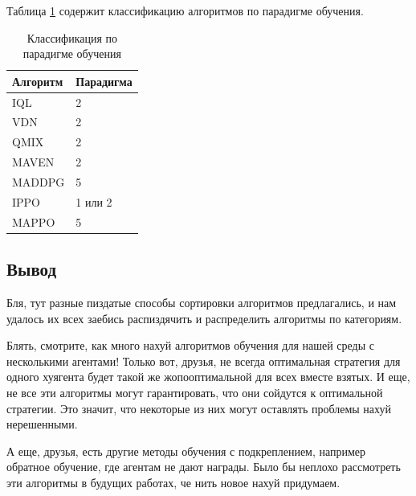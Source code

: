 
Таблица \ref{tab:paradigms} содержит классификацию алгоритмов по парадигме обучения.

\begin{table}[H]
	\centering
	\caption{Классификация по парадигме обучения}
	\label{tab:paradigms}
	\begin{tabular}{@{}|l|l|@{}}
	\toprule
	Алгоритм & Парадигма \\ \midrule
	IQL      & 2         \\
	VDN      & 2         \\
	QMIX     & 2         \\
	MAVEN    & 2         \\
	MADDPG   & 5         \\ 
	IPPO     & 1 или 2   \\
	MAPPO    & 5         \\
	\bottomrule
	\end{tabular}
\end{table}

\subsection*{Вывод}

Бля, тут разные пиздатые способы сортировки алгоритмов предлагались, и нам удалось их всех заебись распиздячить и распределить алгоритмы по категориям.


Блять, смотрите, как много нахуй алгоритмов обучения для нашей среды с несколькими агентами! Только вот, друзья, не всегда оптимальная стратегия для одного хуягента будет такой же жопооптимальной для всех вместе взятых. И еще, не все эти алгоритмы могут гарантировать, что они сойдутся к оптимальной стратегии. Это значит, что некоторые из них могут оставлять проблемы нахуй нерешенными.

А еще, друзья, есть другие методы обучения с подкреплением, например обратное обучение, где агентам не дают награды. Было бы неплохо рассмотреть эти алгоритмы в будущих работах, че нить новое нахуй придумаем.